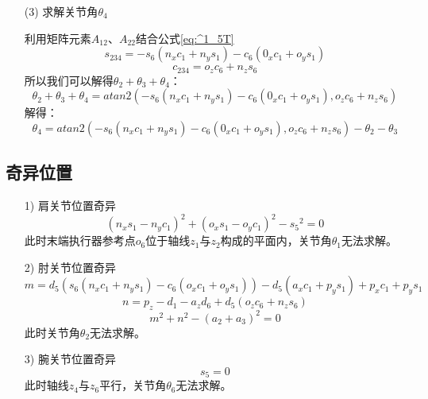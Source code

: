 \documentclass{seuthesis-2022}
\numberwithin{equation}{section}
\begin{document}
\begin{itemize}
  \item [(3)]
  求解关节角$\theta_4$
  
  利用矩阵元素$A_{12}$、$A_{22}$结合公式\eqref{eq:^1_5T}
  \begin{equation}
    s_{234} = -s_6(n_xc_1+n_ys_1)-c_6(0_xc_1+o_ys_1)
  \end{equation}
  \begin{equation}
    c_{234} = o_zc_6+n_zs_6
  \end{equation}
  所以我们可以解得$\theta_2+\theta_3+\theta_4$：
  \begin{equation}
    \theta_2+\theta_3+\theta_4 = atan2(-s_6(n_xc_1+n_ys_1)-c_6(0_xc_1+o_ys_1),o_zc_6+n_zs_6)
  \end{equation}
  解得：
  \begin{equation}
    \theta_4 = atan2(-s_6(n_xc_1+n_ys_1)-c_6(0_xc_1+o_ys_1),o_zc_6+n_zs_6) - \theta_2 - \theta_3
  \end{equation}

\end{itemize}

\subsection{奇异位置}
\begin{itemize}
  \item [1)]
  肩关节位置奇异
  \begin{equation}    
    (n_xs_1-n_yc_1)^2+(o_xs_1-o_yc_1)^2-{s_5}^2 = 0
  \end{equation}
  此时末端执行器参考点$o_6$位于轴线$z_1$与$z_2$构成的平面内，关节角$\theta_1$无法求解。
  \item [2)]
  肘关节位置奇异
  \begin{equation}
    m = d_5\left(s_6(n_xc_1+n_ys_1)-c_6(o_xc_1+o_ys_1)\right) - d_5(a_xc_1+p_ys_1) + p_xc_1 + p_ys_1
  \end{equation}
  \begin{equation}
    n = p_z-d_1-a_zd_6 +d_5(o_zc_6+n_zs_6)
  \end{equation}
  \begin{equation}
    m^2+n^2 - (a_2+a_3)^2 = 0
  \end{equation}
  此时关节角$\theta_2$无法求解。
  \item [3)]
  腕关节位置奇异
  \begin{equation}
    s_5 = 0
  \end{equation}
  此时轴线$z_4$与$z_6$平行，关节角$\theta_6$无法求解。
\end{itemize}
\end{document}

